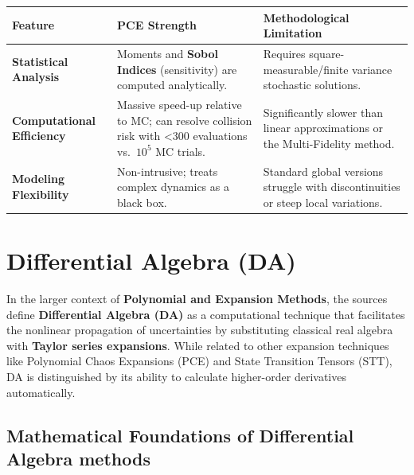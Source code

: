 \documentclass[
  letterpaper,
  DIV=11,
  numbers=noendperiod,
  oneside]{scrartcl}
\newcounter{none} %
\begin{document}
{\def\LTcaptype{none} %
\begin{longtable}[]{@{}
  >{\raggedright\arraybackslash}p{}
  >{\raggedright\arraybackslash}p{}
  >{\raggedright\arraybackslash}p{}@{}}
\toprule\noalign{}
\begin{minipage}[b]{\linewidth}\raggedright
Feature
\end{minipage} & \begin{minipage}[b]{\linewidth}\raggedright
PCE Strength
\end{minipage} & \begin{minipage}[b]{\linewidth}\raggedright
Methodological Limitation
\end{minipage} \\
\midrule\noalign{}
\endhead
\bottomrule\noalign{}
\endlastfoot
\textbf{Statistical Analysis} & Moments and \textbf{Sobol Indices}
(sensitivity) are computed analytically. & Requires
square-measurable/finite variance stochastic solutions. \\
\textbf{Computational Efficiency} & Massive speed-up relative to MC; can
resolve collision risk with \textless300 evaluations vs.~\(10^5\) MC
trials. & Significantly slower than linear approximations or the
Multi-Fidelity method. \\
\textbf{Modeling Flexibility} & Non-intrusive; treats complex dynamics
as a black box. & Standard global versions struggle with discontinuities
or steep local variations. \\
\end{longtable}
}

\section{Differential Algebra (DA)}\label{differential-algebra-da}

In the larger context of \textbf{Polynomial and Expansion Methods}, the
sources define \textbf{Differential Algebra (DA)} as a computational
technique that facilitates the nonlinear propagation of uncertainties by
substituting classical real algebra with \textbf{Taylor series
expansions}. While related to other expansion techniques like Polynomial
Chaos Expansions (PCE) and State Transition Tensors (STT), DA is
distinguished by its ability to calculate higher-order derivatives
automatically.

\subsection{Mathematical Foundations of Differential Algebra
methods}\label{mathematical-foundations-of-differential-algebra-methods}
\end{document}
